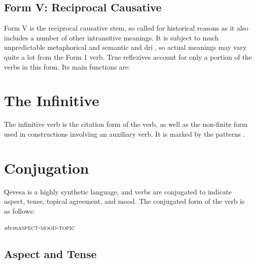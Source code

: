 \documentclass[grammar]{subfiles}
\begin{document}
  \subsection{Form V: Reciprocal Causative}
  \label{ssec:vm_form_v}

   Form V is the reciprocal causative stem, so called for historical reasons as
   it also includes a number of other intransitive meanings. It is subject to
   much unpredictable metaphorical and semantic and dri, so actual meanings
   may vary quite a lot from the Form 1 verb. True reflexives account for only
   a portion of the verbs in this form. Its main functions are:
%   
%   

  \section{The Infinitive}
  \label{sec:vm_infinitive}

  The infinitive verb is the citation form of the verb, as well as the
  non-finite form used in constructions involving an auxiliary verb.  It is
  marked by the patterns .

  \ToBeWritten


  \section{Conjugation}
  \label{sec:vm_conjugation}

  Qevesa is a highly synthetic language, and verbs are conjugated to indicate
  aspect, tense, topical agreement, and mood.  The conjugated form of the verb
  is as follows:

  \begin{exe}
    \ex\label{exe:vm_conjugation} \textit{stem}\bs\textsc{aspect-mood-topic}
  \end{exe}

  \subsection{Aspect and Tense}
  \label{ssec:vm_aspect_tense}
  
  
\end{document}
